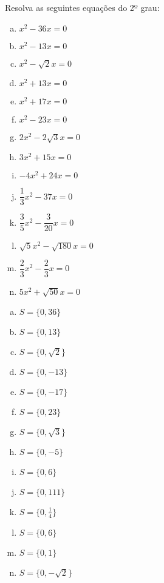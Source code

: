 \begin{exer}
Resolva as seguintes equações do 2º grau:
\begin{multicols}{3}
\begin{enumerate}[a)]
\item $x^2 - 36x=0$
\item $x^2 - 13x=0$
\item $x^2 - \sqrt{2}x=0$
\item $x^2 + 13x=0$
\item $x^2 + 17x=0$
\item $x^2 - 23x=0$
\item $2x^2 - 2\sqrt{3}x= 0$
\item $3x^2 + 15x=0$
\item $-4x^2 + 24x=0$
\item $\dfrac{1}{3}x^2 - 37x=0$
\item $\dfrac{3}{5}x^2 - \dfrac{3}{20}x=0$
\item $\sqrt{5}x^2 - \sqrt{180}x=0$
\item $\dfrac{2}{3}x^2 - \dfrac{2}{3}x=0$
\item $5x^2 + \sqrt{50}x= 0$
\end{enumerate}
\end{multicols}
\end{exer}
\begin{resp}
\begin{multicols}{3}
\begin{enumerate}[a)]
\item $S= \{ 0, 36\} $
\item $S= \{0, 13 \} $
\item $S= \{0, \sqrt{2} \} $
\item $S= \{0, -13 \} $
\item $S= \{0, -17 \} $
\item $S= \{0, 23 \} $
\item $S= \{0, \sqrt{3} \} $
\item $S= \{0, -5 \} $
\item $S= \{0, 6 \} $
\item $S= \{0, 111 \} $
\item $S= \{0, \frac{1}{4} \}$
\item $S= \{0, 6 \} $
\item $S= \{0, 1 \} $
\item $S= \{0, -\sqrt{2} \} $
\end{enumerate}
\end{multicols}
\end{resp}

